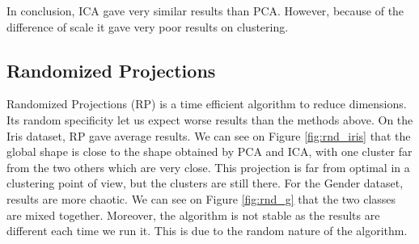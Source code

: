 \documentclass[twocolumn, 10pt]{article}
\begin{document}
			In conclusion, ICA gave very similar results than PCA. However, because of the difference of scale it gave very poor results on clustering.
		\subsection{Randomized Projections}
			Randomized Projections (RP) is a time efficient algorithm to reduce dimensions. Its random specificity let us expect worse results than the methods above. On the Iris dataset, RP gave average results. We can see on Figure \ref{fig:rnd_iris} that the global shape is close to the shape obtained by PCA and ICA, with one cluster far from the two others which are very close. This projection is far from optimal in a clustering point of view, but the clusters are still there. For the Gender dataset, results are more chaotic. We can see on Figure \ref{fig:rnd_g} that the two classes are mixed together. Moreover, the algorithm is not stable as the results are different each time we run it. This is due to the random nature of the algorithm.
\end{document}
